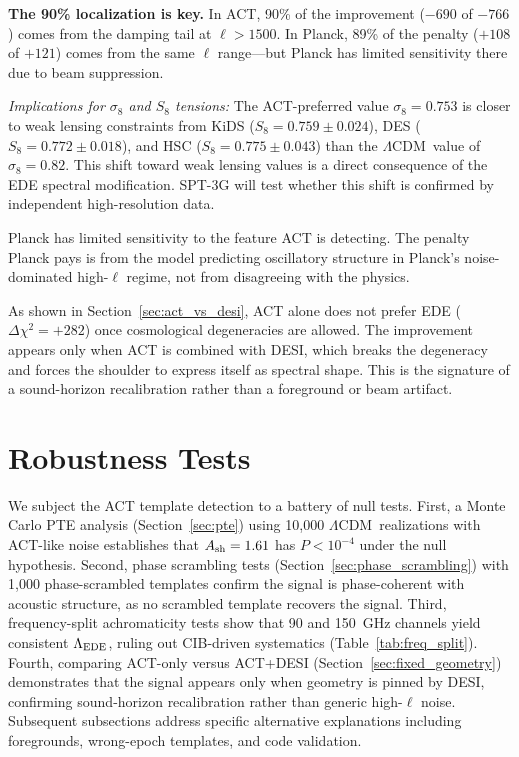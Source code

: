 \documentclass[onecolumn,showpacs,preprintnumbers,amsmath,amssymb,prd]{revtex4-2}
\newcommand{\lcdm}{$\Lambda$CDM}
\begin{document}
\textbf{The 90\% localization is key.} In ACT, 90\% of the improvement ($-690$ 
of $-766$) comes from the damping tail at $\ell > 1500$. In Planck, 89\% of 
the penalty ($+108$ of $+121$) comes from the same $\ell$ range---but Planck 
has limited sensitivity there due to beam suppression.

\emph{Implications for $\sigma_8$ and $S_8$ tensions:} The ACT-preferred 
value $\sigma_8 = 0.753$ is closer to weak lensing constraints from 
KiDS ($S_8 = 0.759 \pm 0.024$), DES ($S_8 = 0.772 \pm 0.018$), and HSC 
($S_8 = 0.775 \pm 0.043$) than the \lcdm\ value of $\sigma_8 = 0.82$. 
This shift toward weak lensing values is a direct consequence of the 
EDE spectral modification. SPT-3G will test whether this shift is 
confirmed by independent high-resolution data.

Planck has limited sensitivity to the feature ACT is detecting. The penalty 
Planck pays is from the model predicting oscillatory structure in Planck's 
noise-dominated high-$\ell$ regime, not from disagreeing with the physics.

As shown in Section~\ref{sec:act_vs_desi}, ACT alone does not prefer EDE 
($\Delta\chi^2 = +282$) once cosmological degeneracies are allowed. The 
improvement appears only when ACT is combined with DESI, which breaks the 
degeneracy and forces the shoulder to express itself as spectral shape. 
This is the signature of a sound-horizon recalibration rather than a 
foreground or beam artifact.

\section{Robustness Tests}
\label{sec:robust}

We subject the ACT template detection to a battery of null tests. First, a Monte Carlo PTE analysis (Section~\ref{sec:pte}) using 10,000 \lcdm\ realizations with ACT-like noise establishes that $A_{\rm sh} = 1.61$ has $P < 10^{-4}$ under the null hypothesis. Second, phase scrambling tests (Section~\ref{sec:phase_scrambling}) with 1,000 phase-scrambled templates confirm the signal is phase-coherent with acoustic structure, as no scrambled template recovers the signal. Third, frequency-split achromaticity tests show that 90 and 150~GHz channels yield consistent $\Lambda_{\rm EDE}$, ruling out CIB-driven systematics (Table~\ref{tab:freq_split}). Fourth, comparing ACT-only versus ACT+DESI (Section~\ref{sec:fixed_geometry}) demonstrates that the signal appears only when geometry is pinned by DESI, confirming sound-horizon recalibration rather than generic high-$\ell$ noise. Subsequent subsections address specific alternative explanations including foregrounds, wrong-epoch templates, and code validation.
\end{document}
